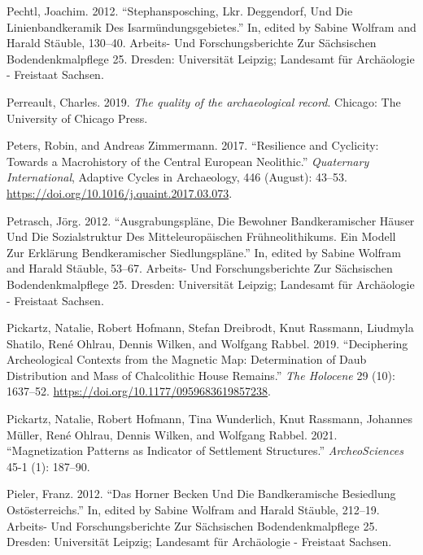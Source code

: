 \documentclass[
  12pt,
  a4paper, twoside]{book}
\newlength{\cslhangindent}
\newlength{\cslentryspacingunit} %
\newenvironment{CSLReferences}[2] %
 {%
  \setlength{\parindent}{0pt}
  \ifodd #1
  \let\oldpar\par
  \def\par{\hangindent=\cslhangindent\oldpar}
  \fi
  \setlength{\parskip}{#2\cslentryspacingunit}
 }%
 {}
\begin{document}
\begin{CSLReferences}{1}{0}
\leavevmode{}%
Pechtl, Joachim. 2012. {``Stephansposching, Lkr. Deggendorf, Und Die Linienbandkeramik Des Isarmündungsgebietes.''} In, edited by Sabine Wolfram and Harald Stäuble, 130--40. Arbeits- Und Forschungsberichte Zur Sächsischen Bodendenkmalpflege 25. Dresden: Universität Leipzig; Landesamt für Archäologie - Freistaat Sachsen.

\leavevmode{}%
Perreault, Charles. 2019. \emph{The quality of the archaeological record}. Chicago: The University of Chicago Press.

\leavevmode{}%
Peters, Robin, and Andreas Zimmermann. 2017. {``Resilience and Cyclicity: Towards a Macrohistory of the Central European Neolithic.''} \emph{Quaternary International}, Adaptive Cycles in Archaeology, 446 (August): 43--53. \url{https://doi.org/10.1016/j.quaint.2017.03.073}.

\leavevmode{}%
Petrasch, Jörg. 2012. {``Ausgrabungspläne, Die Bewohner Bandkeramischer Häuser Und Die Sozialstruktur Des Mitteleuropäischen Frühneolithikums. Ein Modell Zur Erklärung Bendkeramischer Siedlungspläne.''} In, edited by Sabine Wolfram and Harald Stäuble, 53--67. Arbeits- Und Forschungsberichte Zur Sächsischen Bodendenkmalpflege 25. Dresden: Universität Leipzig; Landesamt für Archäologie - Freistaat Sachsen.

\leavevmode{}%
Pickartz, Natalie, Robert Hofmann, Stefan Dreibrodt, Knut Rassmann, Liudmyla Shatilo, René Ohlrau, Dennis Wilken, and Wolfgang Rabbel. 2019. {``Deciphering Archeological Contexts from the Magnetic Map: Determination of Daub Distribution and Mass of Chalcolithic House Remains.''} \emph{The Holocene} 29 (10): 1637--52. \url{https://doi.org/10.1177/0959683619857238}.

\leavevmode{}%
Pickartz, Natalie, Robert Hofmann, Tina Wunderlich, Knut Rassmann, Johannes Müller, René Ohlrau, Dennis Wilken, and Wolfgang Rabbel. 2021. {``Magnetization Patterns as Indicator of Settlement Structures.''} \emph{ArcheoSciences} 45-1 (1): 187--90.

\leavevmode{}%
Pieler, Franz. 2012. {``Das Horner Becken Und Die Bandkeramische Besiedlung Ostösterreichs.''} In, edited by Sabine Wolfram and Harald Stäuble, 212--19. Arbeits- Und Forschungsberichte Zur Sächsischen Bodendenkmalpflege 25. Dresden: Universität Leipzig; Landesamt für Archäologie - Freistaat Sachsen.


\end{CSLReferences}
\end{document}
